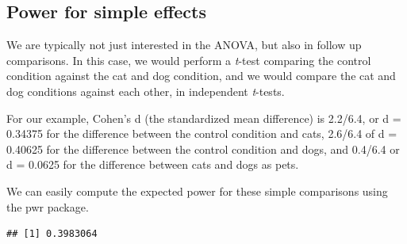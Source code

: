 \documentclass[]{book}
\newenvironment{Shaded}{\begin{snugshade}}{\end{snugshade}}
\newcommand{\DataTypeTok}[1]{\textcolor[rgb]{0.13,0.29,0.53}{#1}}
\newcommand{\DecValTok}[1]{\textcolor[rgb]{0.00,0.00,0.81}{#1}}
\newcommand{\FloatTok}[1]{\textcolor[rgb]{0.00,0.00,0.81}{#1}}
\newcommand{\KeywordTok}[1]{\textcolor[rgb]{0.13,0.29,0.53}{\textbf{#1}}}
\newcommand{\NormalTok}[1]{#1}
\newcommand{\OperatorTok}[1]{\textcolor[rgb]{0.81,0.36,0.00}{\textbf{#1}}}
\newcommand{\StringTok}[1]{\textcolor[rgb]{0.31,0.60,0.02}{#1}}
\begin{document}
\hypertarget{power-for-simple-effects}{%
\subsection{Power for simple effects}\label{power-for-simple-effects}}

We are typically not just interested in the ANOVA, but also in follow up comparisons. In this case, we would perform a \emph{t}-test comparing the control condition against the cat and dog condition, and we would compare the cat and dog conditions against each other, in independent \emph{t}-tests.

For our example, Cohen's d (the standardized mean difference) is 2.2/6.4, or d = 0.34375 for the difference between the control condition and cats, 2.6/6.4 of d = 0.40625 for the difference between the control condition and dogs, and 0.4/6.4 or d = 0.0625 for the difference between cats and dogs as pets.

We can easily compute the expected power for these simple comparisons using the pwr package.

\begin{Shaded}
\end{Shaded}

\begin{verbatim}
## [1] 0.3983064
\end{verbatim}

\begin{Shaded}
\end{Shaded}
\end{document}
